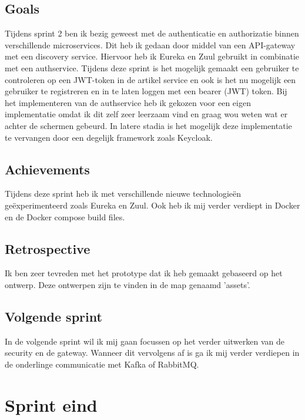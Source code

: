 \documentclass[11pt, twoside]{report}
\begin{document}
    \subsection{Goals}\label{subsec:goals=2}
    Tijdens sprint 2 ben ik bezig geweest met de authenticatie en authorizatie binnen verschillende microservices.
    Dit heb ik gedaan door middel van een API-gateway met een discovery service.
    Hiervoor heb ik Eureka en Zuul gebruikt in combinatie met een authservice.
    Tijdens deze sprint is het mogelijk gemaakt een gebruiker te controleren op een JWT-token in de artikel service en
    ook is het nu mogelijk een gebruiker te registreren en in te laten loggen met een bearer (JWT) token.
    Bij het implementeren van de authservice heb ik gekozen voor een eigen implementatie omdat ik
    dit zelf
    zeer leerzaam vind en graag wou weten wat er achter de schermen gebeurd.
    In latere stadia is het mogelijk deze implementatie te vervangen door een degelijk framework zoals Keycloak.

    \subsection{Achievements}\label{subsec:achievements-2}
    Tijdens deze sprint heb ik met verschillende nieuwe technologieën geëxperimenteerd zoals Eureka en Zuul.
    Ook heb ik mij verder verdiept in Docker en de Docker compose build files.

    \subsection{Retrospective}\label{subsec:retrospective-2}
    Ik ben zeer tevreden met het prototype dat ik heb gemaakt gebaseerd op het ontwerp.
    Deze ontwerpen zijn te vinden in de map genaamd 'assets'.

    \subsection{Volgende sprint}\label{subsec:volgende-sprint-2}
    In de volgende sprint wil ik mij gaan focussen op het verder uitwerken van de security en de gateway.
    Wanneer dit vervolgens af is ga ik mij verder verdiepen in de onderlinge communicatie met Kafka of RabbitMQ.



    \newpage
    \section{Sprint eind}
    \label{sec:sprint-3}
\end{document}
